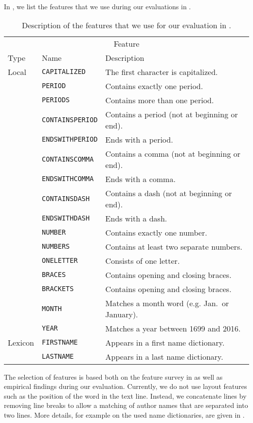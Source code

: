 \bigskip

In , we list the features that we use during our evaluations in .
\begin{table}[t]
\centering
\begin{tabular}{l l l}
  \toprule
  \multicolumn{3}{c}{Feature}\\
  Type    & Name            & Description\\
  \midrule
  Local   & \texttt{CAPITALIZED}     & The first character is capitalized.\\
          & \texttt{PERIOD}          & Contains exactly one period.\\
          & \texttt{PERIODS}         & Contains more than one period.\\
          & \texttt{CONTAINSPERIOD}  & Contains a period (not at beginning or end).\\
          & \texttt{ENDSWITHPERIOD}  & Ends with a period.\\
          & \texttt{CONTAINSCOMMA}   & Contains a comma (not at beginning or end).\\
          & \texttt{ENDSWITHCOMMA}   & Ends with a comma.\\
          & \texttt{CONTAINSDASH}    & Contains a dash (not at beginning or end).\\
          & \texttt{ENDSWITHDASH}    & Ends with a dash.\\
          & \texttt{NUMBER}          & Contains exactly one number.\\
          & \texttt{NUMBERS}         & Contains at least two separate numbers.\\
          & \texttt{ONELETTER}       & Consists of one letter.\\
          & \texttt{BRACES}          & Contains opening and closing braces.\\
          & \texttt{BRACKETS}        & Contains opening and closing braces.\\
          & \texttt{MONTH}           & Matches a month word (e.g. Jan.\ or January).\\
          & \texttt{YEAR}            & Matches a year between 1699 and 2016.\\
  \midrule
  Lexicon & \texttt{FIRSTNAME}     & Appears in a first name dictionary.\\
  & \texttt{LASTNAME}      & Appears in a last name dictionary.\\
  \bottomrule
\end{tabular}
\caption{Description of the features that we use for our evaluation in .}
\label{tab:our-features}
\end{table}
The selection of features is based both on the feature survey in  as well as empirical findings during our evaluation.
Currently, we do not use layout features such as the position of the word in the text line.
Instead, we concatenate lines by removing line breaks to allow a matching of author names that are separated into two lines.
More details, for example on the used name dictionaries, are given in .

